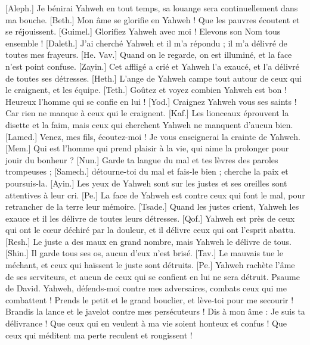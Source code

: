 \begin{multicols}{2}
[Aleph.] Je bénirai Yahweh en tout temps, sa louange sera continuellement dans ma bouche.
[Beth.] Mon âme se glorifie en Yahweh ! Que les pauvres écoutent et se réjouissent.
[Guimel.] Glorifiez Yahweh avec moi ! Elevons son Nom tous ensemble !
[Daleth.] J'ai cherché Yahweh et il m'a répondu ; il m'a délivré de toutes mes frayeurs.
[He. Vav.] Quand on le regarde, on est illuminé, et la face n'est point confuse.
[Zayin.] Cet affligé a crié et Yahweh l'a exaucé, et l'a délivré de toutes ses détresses.
[Heth.] L'ange de Yahweh campe tout autour de ceux qui le craignent, et les équipe.
[Teth.] Goûtez et voyez combien Yahweh est bon ! Heureux l'homme qui se confie en lui !
[Yod.] Craignez Yahweh vous ses saints ! Car rien ne manque à ceux qui le craignent.
[Kaf.] Les lionceaux éprouvent la disette et la faim, mais ceux qui cherchent Yahweh ne manquent d'aucun bien.
[Lamed.] Venez, mes fils, écoutez-moi ! Je vous enseignerai la crainte de Yahweh.
[Mem.] Qui est l'homme qui prend plaisir à la vie, qui aime la prolonger pour jouir du bonheur ?
[Nun.] Garde ta langue du mal et tes lèvres des paroles trompeuses ;
[Samech.] détourne-toi du mal et fais-le bien ; cherche la paix et poursuis-la.
[Ayin.] Les yeux de Yahweh sont sur les justes et ses oreilles sont attentives à leur cri.
[Pe.] La face de Yahweh est contre ceux qui font le mal, pour retrancher de la terre leur mémoire.
[Tsade.] Quand les justes crient, Yahweh les exauce et il les délivre de toutes leurs détresses.
[Qof.] Yahweh est près de ceux qui ont le cœur déchiré par la douleur, et il délivre ceux qui ont l'esprit abattu.
[Resh.] Le juste a des maux en grand nombre, mais Yahweh le délivre de tous.
[Shin.] Il garde tous ses os, aucun d'eux n'est brisé.
[Tav.] Le mauvais tue le méchant, et ceux qui haïssent le juste sont détruits.
[Pe.] Yahweh rachète l'âme de ses serviteurs, et aucun de ceux qui se confient en lui ne sera détruit.
\VerseOne{}Psaume de David. Yahweh, défends-moi contre mes adversaires, combats ceux qui me combattent !
Prends le petit et le grand bouclier, et lève-toi pour me secourir !
Brandis la lance et le javelot contre mes persécuteurs ! Dis à mon âme : Je suis ta délivrance !
Que ceux qui en veulent à ma vie soient honteux et confus ! Que ceux qui méditent ma perte reculent et rougissent !

\end{multicols}
